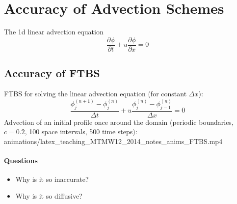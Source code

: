 \cleardoublepage{}


\section{Accuracy of Advection Schemes}

The 1d linear advection equation
\[
\frac{\partial\phi}{\partial t}+u\frac{\partial\phi}{\partial x}=0
\]



\subsection{Accuracy of FTBS}

FTBS for solving the linear advection equation (for constant $\Delta x$):
\[
\frac{\phi_{j}^{(n+1)}-\phi_{j}^{(n)}}{\Delta t}+u\frac{\phi_{j}^{(n)}-\phi_{j-1}^{(n)}}{\Delta x}=0
\]
Advection of an initial profile once around the domain (periodic boundaries,
$c=0.2$, 100 space intervals, 500 time steps):\\
{
{animations/latex_teaching_MTMW12_2014_notes_anims_FTBS.mp4}}


\paragraph*{Questions}
\begin{itemize}
\item Why is it so inaccurate?
\item Why is it so diffusive?
\end{itemize}


